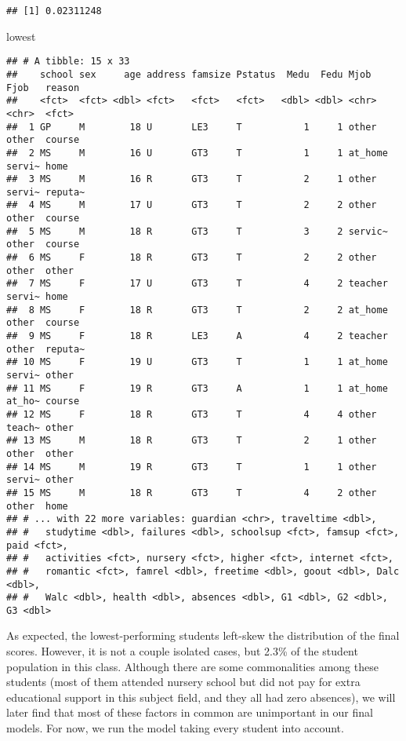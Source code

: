 \documentclass[
]{article}
\newenvironment{Shaded}{\begin{snugshade}}{\end{snugshade}}
\newcommand{\NormalTok}[1]{#1}
\begin{document}
\begin{verbatim}
## [1] 0.02311248
\end{verbatim}

\begin{Shaded}
\begin{Highlighting}[]
\NormalTok{lowest}
\end{Highlighting}
\end{Shaded}

\begin{verbatim}
## # A tibble: 15 x 33
##    school sex     age address famsize Pstatus  Medu  Fedu Mjob    Fjob   reason 
##    <fct>  <fct> <dbl> <fct>   <fct>   <fct>   <dbl> <dbl> <chr>   <chr>  <fct>  
##  1 GP     M        18 U       LE3     T           1     1 other   other  course 
##  2 MS     M        16 U       GT3     T           1     1 at_home servi~ home   
##  3 MS     M        16 R       GT3     T           2     1 other   servi~ reputa~
##  4 MS     M        17 U       GT3     T           2     2 other   other  course 
##  5 MS     M        18 R       GT3     T           3     2 servic~ other  course 
##  6 MS     F        18 R       GT3     T           2     2 other   other  other  
##  7 MS     F        17 U       GT3     T           4     2 teacher servi~ home   
##  8 MS     F        18 R       GT3     T           2     2 at_home other  course 
##  9 MS     F        18 R       LE3     A           4     2 teacher other  reputa~
## 10 MS     F        19 U       GT3     T           1     1 at_home servi~ other  
## 11 MS     F        19 R       GT3     A           1     1 at_home at_ho~ course 
## 12 MS     F        18 R       GT3     T           4     4 other   teach~ other  
## 13 MS     M        18 R       GT3     T           2     1 other   other  other  
## 14 MS     M        19 R       GT3     T           1     1 other   servi~ other  
## 15 MS     M        18 R       GT3     T           4     2 other   other  home   
## # ... with 22 more variables: guardian <chr>, traveltime <dbl>,
## #   studytime <dbl>, failures <dbl>, schoolsup <fct>, famsup <fct>, paid <fct>,
## #   activities <fct>, nursery <fct>, higher <fct>, internet <fct>,
## #   romantic <fct>, famrel <dbl>, freetime <dbl>, goout <dbl>, Dalc <dbl>,
## #   Walc <dbl>, health <dbl>, absences <dbl>, G1 <dbl>, G2 <dbl>, G3 <dbl>
\end{verbatim}

As expected, the lowest-performing students left-skew the distribution
of the final scores. However, it is not a couple isolated cases, but
2.3\% of the student population in this class. Although there are some
commonalities among these students (most of them attended nursery school
but did not pay for extra educational support in this subject field, and
they all had zero absences), we will later find that most of these
factors in common are unimportant in our final models. For now, we run
the model taking every student into account.
\end{document}
